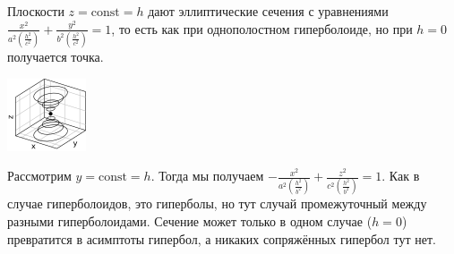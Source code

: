 \documentclass{article}
\begin{document}
\begin{itemize}
\begin{Example}
            Плоскости $z=\mathrm{const}=h$ дают эллиптические сечения с уравнениями $\frac{x^2}{a^2\left(\frac{h^2}{c^2}\right)}+\frac{y^2}{b^2\left(\frac{h^2}{c^2}\right)}=1$, то есть как при однополостном гиперболоиде, но при $h=0$ получается точка.
            \begin{center}
                \ifplotsrender
                \else
                \includegraphics{Images/Поверхности 2 порядка/конус-z.png}
                \fi
            \end{center}
            Рассмотрим $y=\mathrm{const}=h$. Тогда мы получаем $-\frac{x^2}{a^2\left(\frac{h^2}{b^2}\right)}+\frac{z^2}{c^2\left(\frac{h^2}{b^2}\right)}=1$. Как в случае гиперболоидов, это гиперболы, но тут случай промежуточный между разными гиперболоидами. Сечение может только в одном случае ($h=0$) превратится в асимптоты гипербол, а никаких сопряжённых гипербол тут нет.

\end{Example}
\end{itemize}
\end{document}
